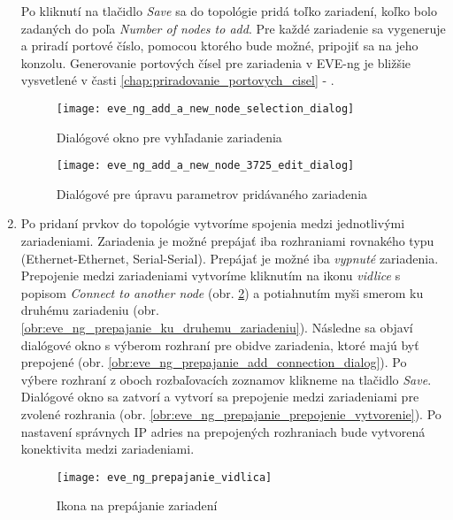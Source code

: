 \begin{enumerate}[noitemsep]
    Po kliknutí na tlačidlo \emph{Save} sa do topológie pridá toľko zariadení, koľko bolo zadaných do poľa \emph{Number of nodes to add}. Pre každé zariadenie sa vygeneruje a priradí portové číslo, pomocou ktorého bude možné, pripojiť sa na jeho konzolu. Generovanie portových čísel pre zariadenia v EVE-ng je bližšie vysvetlené v časti \ref{chap:priradovanie_portovych_cisel} - .
    
\begin{figure}
    \centering
    \texttt{[image: eve\_ng\_add\_a\_new\_node\_selection\_dialog]}
    \caption{Dialógové okno pre vyhľadanie zariadenia}
    \label{obr:eve_ng_add_a_new_node_selection_dialog}
    
    \vspace{1cm}
    
    \centering
    \texttt{[image: eve\_ng\_add\_a\_new\_node\_3725\_edit\_dialog]}
    \caption{Dialógové pre úpravu parametrov pridávaného zariadenia}
    \label{obr:eve_ng_add_a_new_node_3725_edit_dialog}
\end{figure}
    
    \item Po pridaní prvkov do topológie vytvoríme spojenia medzi jednotlivými zariadeniami. Zariadenia je možné prepájať iba rozhraniami rovnakého typu (Ethernet-Ethernet, Serial-Serial). Prepájať je možné iba \emph{vypnuté} zariadenia. Prepojenie medzi zariadeniami vytvoríme kliknutím na ikonu \emph{vidlice} s popisom \emph{Connect to another node} (obr. \ref{obr:eve_ng_prepajanie_vidlica}) a potiahnutím myši smerom ku druhému zariadeniu (obr. \ref{obr:eve_ng_prepajanie_ku_druhemu_zariadeniu}). Následne sa objaví dialógové okno s výberom rozhraní pre obidve zariadenia, ktoré majú byť prepojené (obr. \ref{obr:eve_ng_prepajanie_add_connection_dialog}). Po výbere rozhraní z oboch rozbaľovacích zoznamov klikneme na tlačidlo \emph{Save}. Dialógové okno sa zatvorí a vytvorí sa prepojenie medzi zariadeniami pre zvolené rozhrania (obr. \ref{obr:eve_ng_prepajanie_prepojenie_vytvorenie}). Po nastavení správnych IP adries na prepojených rozhraniach bude vytvorená konektivita medzi zariadeniami.
    
    \begin{figure}
        \centering
        \texttt{[image: eve\_ng\_prepajanie\_vidlica]}
        \caption{Ikona na prepájanie zariadení}
        \label{obr:eve_ng_prepajanie_vidlica}
        

\end{figure}
\end{enumerate}
